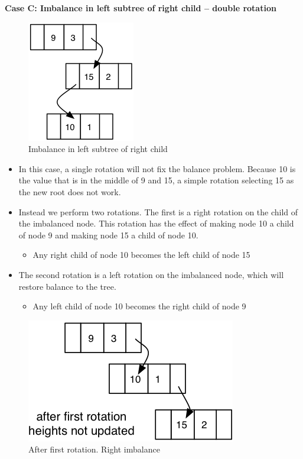 \textbf{Case C: Imbalance in left subtree of right child – double rotation}

\begin{figure}[H]
\centering
\includegraphics{pictures/tree19.png}
\caption{Imbalance in left subtree of right child}
\label{fig:tree19}
\end{figure}

\begin{itemize}
	\item In this case, a single rotation will not fix the balance problem. Because 10 is the value that is in the middle of 9 and 15, a simple rotation selecting 15 as the new root does not work.
	\item Instead we perform two rotations. The first is a right rotation on the child of the imbalanced node. This rotation has the effect of making node 10 a child of node 9 and making node 15 a child of node 10.
\begin{itemize}
	\item Any right child of node 10 becomes the left child of node 15
\end{itemize}
	\item The second rotation is a left rotation on the imbalanced node, which will restore balance to the tree.
\begin{itemize}
	\item Any left child of node 10 becomes the right child of node 9
\end{itemize}
\end{itemize}

\begin{figure}[H]
\centering
\includegraphics{pictures/tree20.png}
\caption{After first rotation. Right imbalance}
\label{fig:tree20}
\end{figure}

